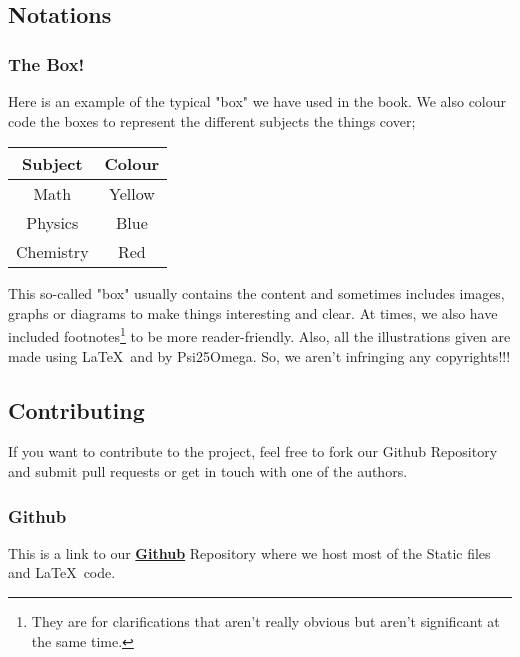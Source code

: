 \subsection{Notations}
\subsubsection{The Box!}
Here is an example of the typical "box" we have used in the book. We also colour code the boxes to represent the different subjects the things cover;
\begin{center}
\begin{tabular}{|c|c|}
\hline
Subject & Colour\\
\hline
Math & Yellow\\
Physics & Blue\\
Chemistry & Red\\
\hline
\end{tabular}
\end{center}
\begin{guidebox}{}
{This so-called "box" usually contains the content and sometimes includes images, graphs or diagrams to make things interesting and clear. At times, we also have included footnotes\footnote{They are for clarifications that aren't really obvious but aren't significant at the same time.} to be more reader-friendly. Also, all the illustrations given are made using \LaTeX~and by Psi25Omega. So, we aren't infringing any copyrights!!!}
\end{guidebox}
\subsection{Contributing}
If you want to contribute to the project, feel free to fork our Github Repository and submit pull requests or get in touch with one of the authors.
\subsubsection{Github}
This is a link to our \textbf{\href{https://github.com/Psi25Omega/Thonk-M-P-C}{Github}} Repository where we host most of the Static files and \LaTeX~code. 
\newpage
